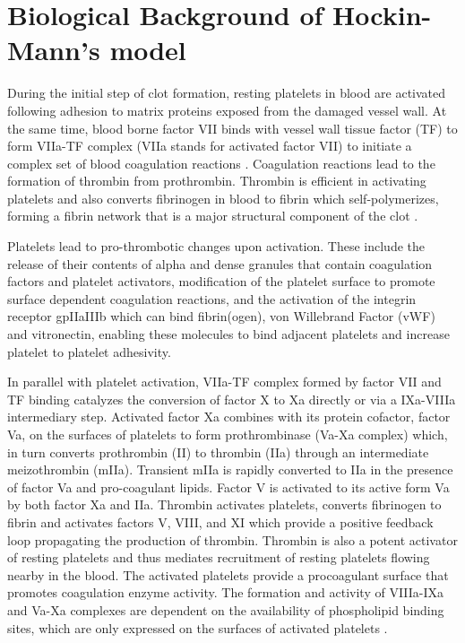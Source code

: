 \def\CTeXPreproc{Created by ctex v0.2.11, don't edit!}\section*{Biological Background of Hockin-Mann's model}
\label{sec:back}


During the initial step of clot formation, resting platelets in
blood are activated following adhesion to matrix proteins exposed
from the damaged vessel wall. At the same time, blood borne factor
VII binds with vessel wall tissue factor (TF) to form VIIa-TF
complex (VIIa stands for activated factor VII) to initiate a complex
set of blood coagulation reactions \cite{Nem92}. Coagulation
reactions lead to the formation of thrombin from prothrombin.
Thrombin is efficient in activating platelets and also converts
fibrinogen in blood to fibrin which self-polymerizes, forming a
fibrin network that is a major
structural component of the clot \cite{HWL,LSK}. %

Platelets lead to pro-thrombotic changes upon activation. These
include the release of their contents of alpha and dense granules
that contain coagulation factors and platelet activators,
modification of the platelet surface to promote surface dependent
coagulation reactions, and the activation of the integrin receptor
gpIIaIIIb which can bind fibrin(ogen), von Willebrand Factor (vWF)
and vitronectin, enabling these molecules to bind adjacent platelets
and increase platelet to platelet adhesivity.


In parallel with platelet activation, VIIa-TF complex formed by
factor VII and TF binding catalyzes the conversion of factor X to Xa
directly or via a IXa-VIIIa intermediary step. Activated factor Xa
combines with its protein cofactor, factor Va, on the surfaces of
platelets to form prothrombinase (Va-Xa complex) which, in turn
converts prothrombin (II) to thrombin (IIa) through an intermediate
meizothrombin (mIIa). Transient mIIa is rapidly converted to IIa in
the presence of factor Va and pro-coagulant lipids. Factor V is
activated to its active form Va by both factor Xa and IIa. Thrombin
activates platelets, converts fibrinogen to fibrin and activates
factors V, VIII, and XI which provide a positive feedback loop
propagating the production of thrombin. Thrombin is also a potent
activator of resting platelets and thus mediates recruitment of
resting platelets flowing nearby in the blood. The activated
platelets provide a procoagulant surface that promotes coagulation
enzyme activity. The formation and activity of VIIIa-IXa and Va-Xa
complexes are dependent on the availability of phospholipid binding
sites, which are only expressed on the surfaces of activated
platelets \cite{AssHer06,BPM,HocJon02,KhaSem89,KF01,LSK}.


